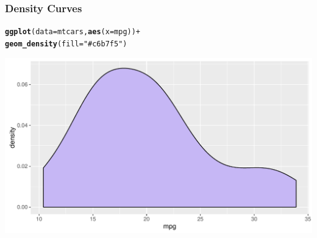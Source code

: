 \documentclass[12pt]{beamer}\usepackage[]{graphicx}\usepackage[]{color}
\makeatletter
\newcommand{\hlstr}[1]{\textcolor[rgb]{0.192,0.494,0.8}{#1}}%
\newcommand{\hlopt}[1]{\textcolor[rgb]{0,0,0}{#1}}%
\newcommand{\hlstd}[1]{\textcolor[rgb]{0.345,0.345,0.345}{#1}}%
\newcommand{\hlkwc}[1]{\textcolor[rgb]{0.333,0.667,0.333}{#1}}%
\newcommand{\hlkwd}[1]{\textcolor[rgb]{0.737,0.353,0.396}{\textbf{#1}}}%
\newenvironment{kframe}{%
 \def\at@end@of@kframe{}%
 \ifinner\ifhmode%
  \def\at@end@of@kframe{\end{minipage}}%
  \begin{minipage}{\columnwidth}%
 \fi\fi%
 \def\FrameCommand##1{\hskip\@totalleftmargin \hskip-\fboxsep
 \colorbox{shadecolor}{##1}\hskip-\fboxsep
     \hskip-\linewidth \hskip-\@totalleftmargin \hskip\columnwidth}%
 \MakeFramed {\advance\hsize-\width
   \@totalleftmargin\z@ \linewidth\hsize
   \@setminipage}}%
 {\par\unskip\endMakeFramed%
 \at@end@of@kframe}
\newenvironment{knitrout}{}{} %
\makeatother
\begin{document}
\begin{frame}[fragile]
\frametitle{Density Curves}

\begin{knitrout}\scriptsize
{}\color{fgcolor}\begin{kframe}
\begin{alltt}
\hlkwd{ggplot}\hlstd{(}\hlkwc{data} \hlstd{= mtcars,} \hlkwd{aes}\hlstd{(}\hlkwc{x} \hlstd{= mpg))} \hlopt{+}
  \hlkwd{geom_density}\hlstd{(}\hlkwc{fill} \hlstd{=} \hlstr{"#c6b7f5"}\hlstd{)}
\end{alltt}
\end{kframe}

{\centering \includegraphics[width=.9\linewidth,height=.5\linewidth]{figure/unnamed-chunk-21-1} 

}



\end{knitrout}

\end{frame}

\end{document}
